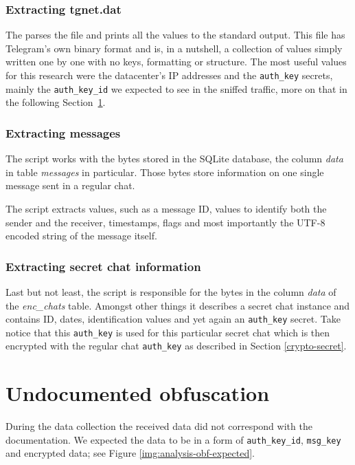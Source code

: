 \documentclass[thesis=M,english]{FITthesis}[2012/10/20]
\begin{document}
\subsubsection{Extracting tgnet.dat}

The  parses the  file and prints all the values to the standard output. This file has Telegram's own binary format and is, in a nutshell, a collection of values simply written one by one with no keys, formatting or structure. The most useful values for this research were the datacenter's IP addresses and the \texttt{auth\_key} secrets, mainly the \texttt{auth\_key\_id} we expected to see in the sniffed traffic, more on that in the following Section~\ref{analysis-obf}.

\subsubsection{Extracting messages}

The script  works with the bytes stored in the SQLite database, the column \emph{data} in table \emph{messages} in particular. Those bytes store information on one single message sent in a regular chat.

The script extracts values, such as a message ID, values to identify both the sender and the receiver, timestamps, flags and most importantly the UTF-8 encoded string of the message itself.

\subsubsection{Extracting secret chat information}

Last but not least, the  script is responsible for the bytes in the column \emph{data} of the \emph{enc\_chats} table. Amongst other things it describes a secret chat instance and contains ID, dates, identification values and yet again an \texttt{auth\_key} secret. Take notice that this \texttt{auth\_key} is used for this particular secret chat which is then encrypted with the regular chat \texttt{auth\_key} as described in Section \ref{crypto-secret}.

\section{Undocumented obfuscation}\label{analysis-obf}

During the data collection the received data did not correspond with the documentation. We expected the data to be in a form of \texttt{auth\_key\_id}, \texttt{msg\_key} and encrypted data; see Figure \ref{img:analysis-obf-expected}.
\end{document}
